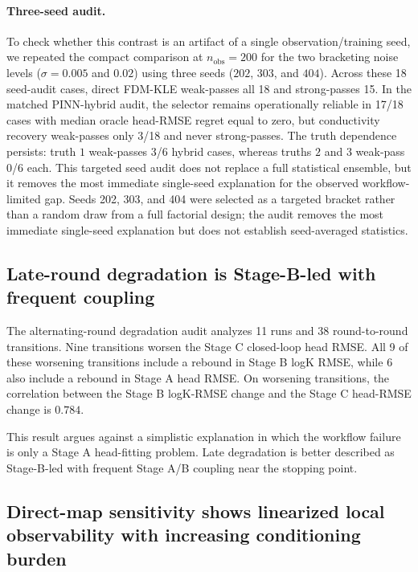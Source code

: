 \documentclass[pdflatex,sn-mathphys,Numbered,iicol]{sn-jnl}
\newcommand{\nobs}{n_{\mathrm{obs}}}
\begin{document}
\paragraph{Three-seed audit.}
To check whether this contrast is an artifact of a single observation/training
seed, we repeated the compact comparison at $\nobs=200$ for the two bracketing
noise levels ($\sigma=0.005$ and $0.02$) using three seeds ($202$, $303$, and
$404$). Across these 18 seed-audit cases, direct FDM-KLE weak-passes all 18
and strong-passes 15. In the matched PINN-hybrid audit, the selector remains
operationally reliable in 17/18 cases with median oracle head-RMSE regret
equal to zero, but conductivity recovery weak-passes only 3/18 and never
strong-passes. The truth dependence persists: truth $1$ weak-passes 3/6
hybrid cases, whereas truths $2$ and $3$ weak-pass 0/6 each. This
targeted seed audit does not replace a full statistical ensemble, but it
removes the most immediate single-seed explanation for the observed
workflow-limited gap. Seeds 202, 303, and 404 were selected as a targeted
bracket rather than a random draw from a full factorial design; the audit
removes the most immediate single-seed explanation but does not establish
seed-averaged statistics.

\subsection{Late-round degradation is Stage-B-led with frequent coupling}
\label{sec:res-degrade}

The alternating-round degradation audit analyzes 11 runs and 38
round-to-round transitions. Nine transitions worsen the Stage C closed-loop
head RMSE. All 9 of these worsening transitions include a rebound in Stage B
logK RMSE, while 6 also include a rebound in Stage A head RMSE. On worsening
transitions, the correlation between the Stage B logK-RMSE change and the
Stage C head-RMSE change is $0.784$.

This result argues against a simplistic explanation in which the workflow
failure is only a Stage A head-fitting problem. Late degradation is better
described as Stage-B-led with frequent Stage A/B coupling near the stopping
point.

\subsection{Direct-map sensitivity shows linearized local observability with
increasing conditioning burden}
\label{sec:res-obs}
\end{document}
